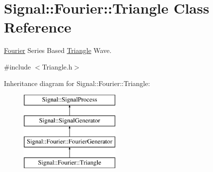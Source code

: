 \hypertarget{classSignal_1_1Fourier_1_1Triangle}{\section{Signal\+:\+:Fourier\+:\+:Triangle Class Reference}
\label{classSignal_1_1Fourier_1_1Triangle}
}


\hyperlink{namespaceSignal_1_1Fourier}{Fourier} Series Based \hyperlink{classSignal_1_1Fourier_1_1Triangle}{Triangle} Wave.  




{\ttfamily \#include $<$Triangle.\+h$>$}

Inheritance diagram for Signal\+:\+:Fourier\+:\+:Triangle\+:\begin{figure}[H]
\begin{center}
\leavevmode
\includegraphics[height=4.000000cm]{classSignal_1_1Fourier_1_1Triangle}
\end{center}
\end{figure}
